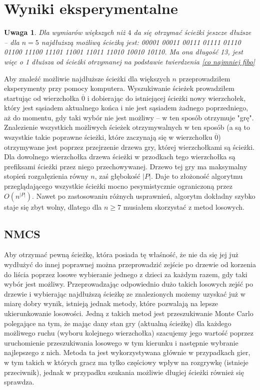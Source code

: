 \documentclass{pracamgr}
\newtheorem{remark}[theorem]{Uwaga}
\begin{document}
   \section{Wyniki eksperymentalne}
    \begin{remark}\label{da sie dluzsze}
     Dla wymiarów większych niż $4$ da się otrzymać ścieżki jeszcze dłuższe -- dla $n=5$ najdłuższą możliwą ścieżką jest:
     00001
     00011
     00111
     01111
     01110
     01100
     11100
     11101
     11001
     11011
     11010
     10010
     10110.\newline
     Ma ona długość 13, jest więc o 1 dłuższa od ścieżki otrzymanej na podstawie twierdzenia \ref{co najmniej fibo}
    \end{remark}
    Aby znaleźć możliwie najdłuższe ścieżki dla większych $n$ przeprowadziłem eksperymenty przy pomocy komputera.
    Wyszukiwanie ścieżek prowadziłem startując od wierzchołka $\overline{0}$ i dobierając do istniejącej ścieżki nowy wierzchołek,
    który jest sąsiadem aktualnego końca i nie jest sąsiadem żadnego poprzedniego, aż do momentu, gdy taki wybór nie jest możliwy 
    -- w ten sposób otrzymuje "grę". Znalezienie wszystkich możliwych ścieżek otrzymywalnych w ten sposób
    (a są to wszystkie takie poprawne ścieżki, które zaczynają się w wierzchołku $\overline{0}$) otrzymywane jest poprzez przejrzenie
    drzewa gry, której wierzchołkami są ścieżki. Dla dowolnego wierzchołka drzewa ścieżki w przodkach tego wierzchołka są prefiksami ścieżki
    przez niego przechowywanej. Drzewo tej gry ma maksymalny stopień rozgałęzienia równy $n$, zaś głębokość $|P|$.\newline
    Daje to złożoność algorytmu przeglądającego wszystkie ścieżki mocno pesymistycznie ograniczoną przez $O(n^{|P|})$. Nawet po zastosowaniu
    różnych usprawnień, algorytm dokładny szybko staje się zbyt wolny, dlatego dla $n\ge7$ musiałem skorzystać z metod losowych.
    \subsection{NMCS}
     Aby otrzymać pewną ścieżkę, która posiada tę właśność, że nie da się jej już wydłużyć do innej poprawnej można przeprowadzić zejście po drzewie
     od korzenia do liścia poprzez losowe wybieranie jednego z dzieci za każdym razem, gdy taki wybór jest możliwy.\newline
     Przeprowadzając odpowiednio dużo takich losowych zejść po drzewie i wybierając najdłuższą ścieżkę ze znalezionych możemy uzyskać już w miarę dobry
     wynik, istnieją jednak metody, które pozwalają na lepsze ukierunkowanie losowości.\newline
     Jedną z takich metod jest przeszukiwanie Monte Carlo polegające na tym, że mając dany stan gry (aktualną ścieżkę) dla każdego możliwego ruchu
     (wyboru kolejnego wierzchołka) szacujemy jego wartość poprzez uruchomienie przeszukiwania losowego w tym kierunku i następnie wybranie najlepszego z nich.
     Metoda ta jest wykorzystywana głównie w przypadkach gier, w tym takich w których gracz ma tylko częściowy wpływ na rozgrywkę (istnieje przeciwnik),
     jednak w przypadku szukania możliwie długiej ścieżki również się sprawdza.
     
\end{document}

